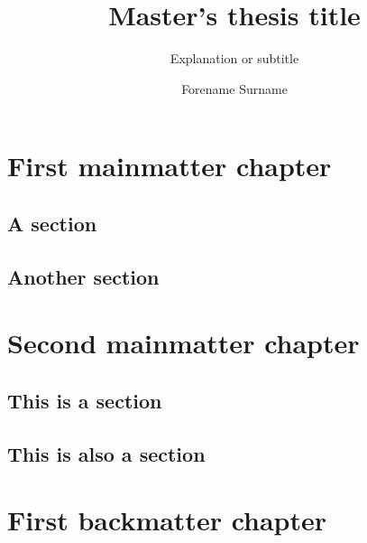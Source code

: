 \documentclass[nocopyright]{uit-thesis-test}
\begin{document}
\title{Master's thesis title}
\subtitle{Explanation or subtitle}
\author{Forename Surname}

\maketitle

\frontmatter

\begin{acknowledgement}
\lipsum[1-5]
\end{acknowledgement}

\tableofcontents

\mainmatter

\chapter{First mainmatter chapter}

\lipsum[1]

\section{A section}
\lipsum[3-8]

\section{Another section}
\lipsum[9]

\chapter{Second mainmatter chapter}

\lipsum[1]

\section{This is a section}
\lipsum[3-8]

\section{This is also a section}
\lipsum[9]

\backmatter

\chapter{First backmatter chapter}
\end{document}
